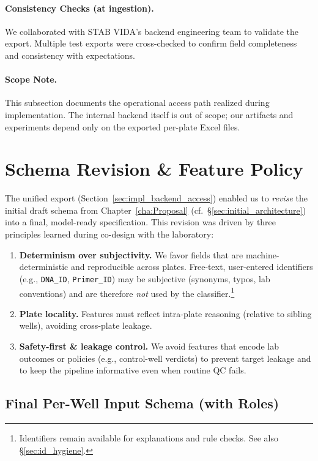 \paragraph{Consistency Checks (at ingestion).}
We collaborated with STAB VIDA’s backend engineering team to validate the export. Multiple test exports were cross-checked to confirm field completeness and consistency with expectations.

\paragraph{Scope Note.}
This subsection documents the operational access path realized during implementation. The internal backend itself is out of scope; our artifacts and experiments depend only on the exported per-plate Excel files.


\section{Schema Revision \& Feature Policy}
\label{sec:schema_revision}

The unified export (Section~\ref{sec:impl_backend_access}) enabled us to \emph{revise} the initial draft schema from Chapter~\ref{cha:Proposal} (cf.\ \S\ref{sec:initial_architecture}) into a final, model-ready specification. This revision was driven by three principles learned during co-design with the laboratory:

\begin{enumerate}
  \item \textbf{Determinism over subjectivity.} We favor fields that are machine-deterministic and reproducible across plates. Free-text, user-entered identifiers (e.g., \texttt{DNA\_ID}, \texttt{Primer\_ID}) may be subjective (synonyms, typos, lab conventions) and are therefore \emph{not} used by the classifier.\footnote{Identifiers remain available for explanations and rule checks. See also \S\ref{sec:id_hygiene}.}
  \item \textbf{Plate locality.} Features must reflect intra-plate reasoning (relative to sibling wells), avoiding cross-plate leakage.
  \item \textbf{Safety-first \& leakage control.} We avoid features that encode lab outcomes or policies (e.g., control-well verdicts) to prevent target leakage and to keep the pipeline informative even when routine QC fails.
\end{enumerate}

\subsection{Final Per-Well Input Schema (with Roles)}
\label{sec:final_schema_roles}

